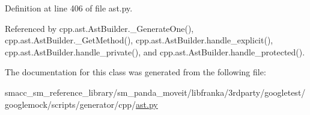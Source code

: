 Definition at line 406 of file ast.\+py.



Referenced by cpp.\+ast.\+Ast\+Builder.\+\_\+\+Generate\+One(), cpp.\+ast.\+Ast\+Builder.\+\_\+\+Get\+Method(), cpp.\+ast.\+Ast\+Builder.\+handle\+\_\+explicit(), cpp.\+ast.\+Ast\+Builder.\+handle\+\_\+private(), and cpp.\+ast.\+Ast\+Builder.\+handle\+\_\+protected().



The documentation for this class was generated from the following file\+:\begin{DoxyCompactItemize}
\item 
smacc\+\_\+sm\+\_\+reference\+\_\+library/sm\+\_\+panda\+\_\+moveit/libfranka/3rdparty/googletest/googlemock/scripts/generator/cpp/\hyperlink{ast_8py}{ast.\+py}\end{DoxyCompactItemize}
